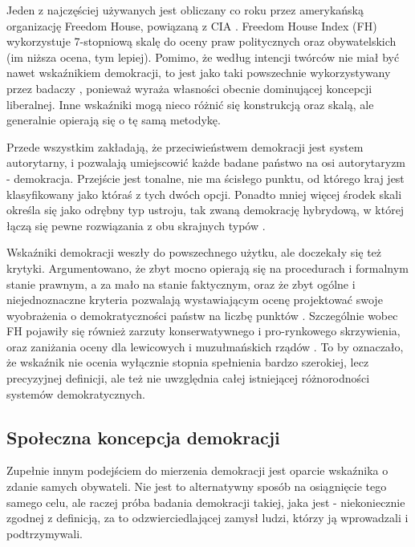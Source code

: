 \documentclass[12pt]{article}
\begin{document}
Jeden z najczęściej używanych jest obliczany co roku przez amerykańską organizację Freedom House, powiązaną z CIA \citep{Doorenspleet}. Freedom House Index (FH) wykorzystuje 7-stopniową skalę do oceny praw politycznych oraz obywatelskich (im niższa ocena, tym lepiej). Pomimo, że według intencji twórców nie miał być nawet wskaźnikiem demokracji, to jest jako taki powszechnie wykorzystywany przez badaczy \citep{Coppedge}, ponieważ wyraża własności obecnie dominującej koncepcji liberalnej. Inne wskaźniki mogą nieco różnić się konstrukcją oraz skalą, ale generalnie opierają się o tę samą metodykę.

Przede wszystkim zakładają, że przeciwieństwem demokracji jest system autorytarny, i pozwalają umiejscowić każde badane państwo na osi autorytaryzm - demokracja. Przejście jest tonalne, nie ma ścisłego punktu, od którego kraj jest klasyfikowany jako któraś z tych dwóch opcji. Ponadto mniej więcej środek skali określa się jako odrębny typ ustroju, tak zwaną demokrację hybrydową, w której łączą się pewne rozwiązania z obu skrajnych typów \citep{Doorenspleet}.

Wskaźniki demokracji weszły do powszechnego użytku, ale doczekały się też krytyki. Argumentowano, że zbyt mocno opierają się na procedurach i formalnym stanie prawnym, a za mało na stanie faktycznym, oraz że zbyt ogólne i niejednoznaczne kryteria pozwalają wystawiającym ocenę projektować swoje wyobrażenia o demokratyczności państw na liczbę punktów \citep{Coppedge}. Szczególnie wobec FH pojawiły się również zarzuty konserwatywnego i pro-rynkowego skrzywienia, oraz zaniżania oceny dla lewicowych i muzułmańskich rządów \citep{Doorenspleet}. To by oznaczało, że wskaźnik nie ocenia wyłącznie stopnia spełnienia bardzo szerokiej, lecz precyzyjnej definicji, ale też nie uwzględnia całej istniejącej różnorodności systemów demokratycznych.

\hypertarget{spoux142eczna-koncepcja-demokracji}{%
\subsection{Społeczna koncepcja demokracji}\label{spoux142eczna-koncepcja-demokracji}}

Zupełnie innym podejściem do mierzenia demokracji jest oparcie wskaźnika o zdanie samych obywateli. Nie jest to alternatywny sposób na osiągnięcie tego samego celu, ale raczej próba badania demokracji takiej, jaka jest - niekoniecznie zgodnej z definicją, za to odzwierciedlającej zamysł ludzi, którzy ją wprowadzali i podtrzymywali.
\end{document}
